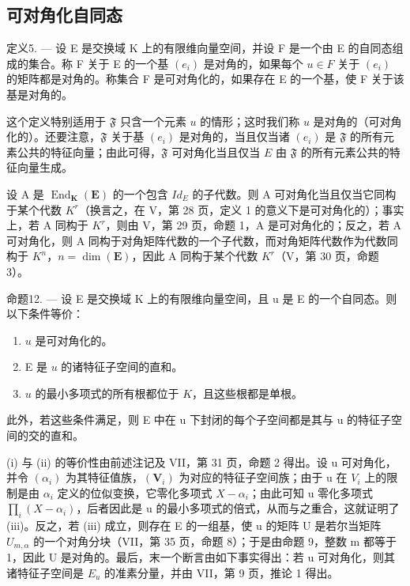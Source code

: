 \subsection{可对角化自同态}

定义5. --- 设 E 是交换域 K 上的有限维向量空间，并设 F 是一个由 E 的自同态组成的集合。称 F 关于 E 的一个基 \((e_{i})\) 是对角的，如果每个 \(u \in F\) 关于 \((e_{i})\) 的矩阵都是对角的。称集合 F 是可对角化的，如果存在 E 的一个基，使 F 关于该基是对角的。

这个定义特别适用于 \(\mathfrak{F}\) 只含一个元素 \(u\) 的情形；这时我们称 \(u\) 是对角的（可对角化的）。还要注意，\(\mathfrak{F}\) 关于基 \((e_i)\) 是对角的，当且仅当诸 \((e_i)\) 是 \(\mathfrak{F}\) 的所有元素公共的特征向量；由此可得，\(\mathfrak{F}\) 可对角化当且仅当 \(E\) 由 \(\mathfrak{F}\) 的所有元素公共的特征向量生成。

设 A 是 \(\operatorname{End}_{\mathbf{K}}(\mathbf{E})\) 的一个包含 \(Id_{E}\) 的子代数。则 A 可对角化当且仅当它同构于某个代数 \(K^{r}\)（换言之，在 V，第 28 页，定义 1 的意义下是可对角化的）；事实上，若 A 同构于 \(K^{r}\)，则由 V，第 29 页，命题 1，A 是可对角化的；反之，若 A 可对角化，则 A 同构于对角矩阵代数的一个子代数，而对角矩阵代数作为代数同构于 \(K^{n}\)，\(n = \dim(\mathbf{E})\)，因此 A 同构于某个代数 \(K^{r}\)（V，第 30 页，命题 3）。

命题12. --- 设 E 是交换域 K 上的有限维向量空间，且 u 是 E 的一个自同态。则以下条件等价：

\begin{enumerate}
\def\labelenumi{(\roman{enumi})}
\item
  \(u\) 是可对角化的。
\item
  E 是 \(u\) 的诸特征子空间的直和。
\item
  \(u\) 的最小多项式的所有根都位于 \(K\)，且这些根都是单根。
\end{enumerate}

此外，若这些条件满足，则 E 中在 u 下封闭的每个子空间都是其与 u 的特征子空间的交的直和。

(i) 与 (ii) 的等价性由前述注记及 VII，第 31 页，命题 2 得出。设 u 可对角化，并令 \((\alpha_{i})\) 为其特征值族，\((\mathbf{V}_{i})\) 为对应的特征子空间族；由于 u 在 \(V_{i}\) 上的限制是由 \(\alpha_{i}\) 定义的位似变换，它零化多项式 \(X - \alpha_{i}\)；由此可知 u 零化多项式 \(\prod_{i}(X - \alpha_{i})\)，后者因此是 u 的最小多项式的倍式，从而与之重合，这就证明了 (iii)。反之，若 (iii) 成立，则存在 E 的一组基，使 u 的矩阵 U 是若尔当矩阵 \(U_{m,\alpha}\) 的一个对角分块（VII，第 35 页，命题 8）；于是由命题 9，整数 m 都等于 1，因此 U 是对角的。最后，末一个断言由如下事实得出：若 u 可对角化，则其诸特征子空间是 \(E_{u}\) 的准素分量，并由 VII，第 9 页，推论 1 得出。

